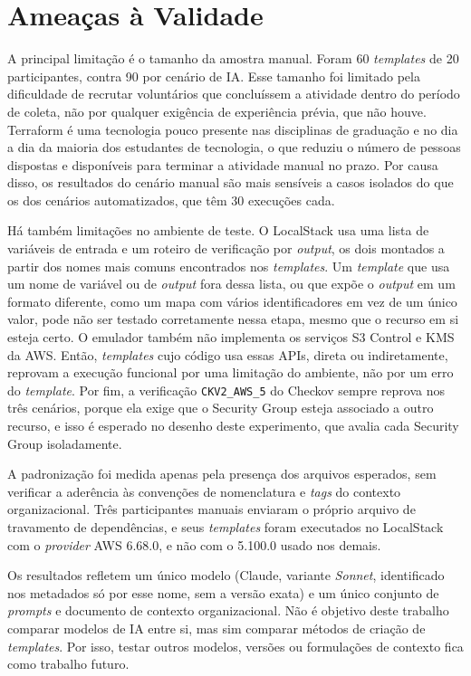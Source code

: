 \section{Ameaças à Validade}
\label{sec:ameacas}

A principal limitação é o tamanho da amostra manual. Foram 60 \textit{templates} de 20 participantes, contra 90 por cenário de IA. Esse tamanho foi limitado pela dificuldade de recrutar voluntários que concluíssem a atividade dentro do período de coleta, não por qualquer exigência de experiência prévia, que não houve. Terraform é uma tecnologia pouco presente nas disciplinas de graduação e no dia a dia da maioria dos estudantes de tecnologia, o que reduziu o número de pessoas dispostas e disponíveis para terminar a atividade manual no prazo. Por causa disso, os resultados do cenário manual são mais sensíveis a casos isolados do que os dos cenários automatizados, que têm 30 execuções cada.

Há também limitações no ambiente de teste. O LocalStack usa uma lista de variáveis de entrada e um roteiro de verificação por \textit{output}, os dois montados a partir dos nomes mais comuns encontrados nos \textit{templates}. Um \textit{template} que usa um nome de variável ou de \textit{output} fora dessa lista, ou que expõe o \textit{output} em um formato diferente, como um mapa com vários identificadores em vez de um único valor, pode não ser testado corretamente nessa etapa, mesmo que o recurso em si esteja certo. O emulador também não implementa os serviços S3 Control e KMS da AWS. Então, \textit{templates} cujo código usa essas APIs, direta ou indiretamente, reprovam a execução funcional por uma limitação do ambiente, não por um erro do \textit{template}. Por fim, a verificação \texttt{CKV2\_AWS\_5} do Checkov sempre reprova nos três cenários, porque ela exige que o Security Group esteja associado a outro recurso, e isso é esperado no desenho deste experimento, que avalia cada Security Group isoladamente.

A padronização foi medida apenas pela presença dos arquivos esperados, sem verificar a aderência às convenções de nomenclatura e \textit{tags} do contexto organizacional. Três participantes manuais enviaram o próprio arquivo de travamento de dependências, e seus \textit{templates} foram executados no LocalStack com o \textit{provider} AWS 6.68.0, e não com o 5.100.0 usado nos demais.

Os resultados refletem um único modelo (Claude, variante \textit{Sonnet}, identificado nos metadados só por esse nome, sem a versão exata) e um único conjunto de \textit{prompts} e documento de contexto organizacional. Não é objetivo deste trabalho comparar modelos de IA entre si, mas sim comparar métodos de criação de \textit{templates}. Por isso, testar outros modelos, versões ou formulações de contexto fica como trabalho futuro.
